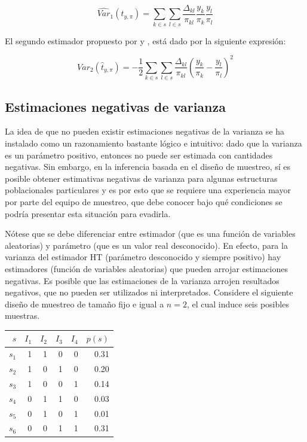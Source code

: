 \documentclass[
  12pt,
]{book}
\begin{document}
\[
\widehat{Var}_1(\hat{t}_{y, \pi})=
\sum_{k\in s}\sum_{l\in s} \frac{\Delta_{kl}}{\pi_{kl}}\frac{y_k}{\pi_k}\frac{y_l}{\pi_l}
\]

El segundo estimador propuesto por \citet{Sen} y \citet{YG}, está dado por la siguiente expresión:

\[
\widehat{Var}_2(\hat{t}_{y, \pi})=-\frac{1}{2}
\sum_{k\in s}\sum_{l\in s} \frac{\Delta_{kl}}{\pi_{kl}}\left(\frac{y_k}{\pi_k}-\frac{y_l}{\pi_l}\right)^2
\]

\hypertarget{estimaciones-negativas-de-varianza}{%
\subsection{Estimaciones negativas de varianza}\label{estimaciones-negativas-de-varianza}}

La idea de que no pueden existir estimaciones negativas de la varianza se ha instalado como un razonamiento bastante lógico e intuitivo: dado que la varianza es un parámetro positivo, entonces no puede ser estimada con cantidades negativas. Sin embargo, en la inferencia basada en el diseño de muestreo, sí es posible obtener estimativas negativas de varianza para algunas estructuras poblacionales particulares y es por esto que se requiere una experiencia mayor por parte del equipo de muestreo, que debe conocer bajo qué condiciones se podría presentar esta situación para evadirla.

Nótese que se debe diferenciar entre estimador (que es una función de variables aleatorias) y parámetro (que es un valor real desconocido). En efecto, para la varianza del estimador HT (parámetro desconocido y siempre positivo) hay estimadores (función de variables aleatorias) que pueden arrojar estimaciones negativas. Es posible que las estimaciones de la varianza arrojen resultados negativos, que no pueden ser utilizados ni interpretados. Considere el siguiente diseño de muestreo de tamaño fijo e igual a \(n=2\), el cual induce seis posibles muestras.

\begin{longtable}[]{@{}rrrrrr@{}}
\toprule()
\(s\) & \(I_1\) & \(I_2\) & \(I_3\) & \(I_4\) & \(p(s)\) \\
\midrule()
\endhead
\(s_1\) & 1 & 1 & 0 & 0 & 0.31 \\
\(s_2\) & 1 & 0 & 1 & 0 & 0.20 \\
\(s_3\) & 1 & 0 & 0 & 1 & 0.14 \\
\(s_4\) & 0 & 1 & 1 & 0 & 0.03 \\
\(s_5\) & 0 & 1 & 0 & 1 & 0.01 \\
\(s_6\) & 0 & 0 & 1 & 1 & 0.31 \\
\bottomrule()
\end{longtable}
\end{document}
